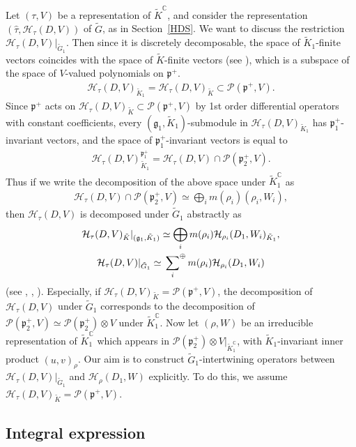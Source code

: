 \documentclass[pdftex]{sigma}
\numberwithin{equation}{section}
\newcommand{\BC}{\mathbb{C}}
\newcommand{\fg}{\mathfrak{g}}
\newcommand{\fp}{\mathfrak{p}}
\newcommand{\cH}{\mathcal{H}}
\newcommand{\cP}{\mathcal{P}}
\newcommand{\hsum}{\sideset{}{^\oplus}{\sum}}
\begin{document}
Let $(\tau,V)$ be a representation of $\tilde{K}^\BC$, and consider the representation $(\hat{\tau},\cH_\tau(D,V))$ of $\tilde{G}$, as in Section~\ref{HDS}.
We want to discuss the restriction $\cH_\tau(D,V)|_{\tilde{G}_1}$.
Then since it is discretely decomposable, the space of $\tilde{K}_1$-finite vectors coincides with the space of $\tilde{K}$-finite vectors
(see \cite[Theorem~4.5]{K1}),
which is a subspace of the space of $V$-valued polynomials on $\fp^+$.
\begin{gather*} \cH_\tau(D,V)_{\tilde{K}_1}=\cH_\tau(D,V)_{\tilde{K}}\subset\cP(\fp^+,V). \end{gather*}
Since $\fp^+$ acts on $\cH_\tau(D,V)_{\tilde{K}}\subset\cP(\fp^+,V)$ by 1st order differential operators with constant coefficients,
every $(\fg_1,\tilde{K}_1)$-submodule in $\cH_\tau(D,V)_{\tilde{K}_1}$ has $\fp^+_1$-invariant vectors,
and the space of $\fp^+_1$-invariant vectors is equal to
\begin{gather*} \cH_\tau(D,V)_{\tilde{K}_1}^{\fp^+_1}=\cH_\tau(D,V)\cap\cP(\fp^+_2,V). \end{gather*}
Thus if we write the decomposition of the above space under $\tilde{K}_1^\BC$ as
\begin{gather*} \cH_\tau(D,V)\cap\cP(\fp^+_2,V)\simeq \bigoplus_i m(\rho_i)(\rho_i,W_i), \end{gather*}
then $\cH_\tau(D,V)$ is decomposed under $\tilde{G}_1$ abstractly as
\begin{gather*}
\cH_\tau(D,V)_{\tilde{K}}|_{(\fg_1,\tilde{K}_1)} \simeq \bigoplus_i m(\rho_i)\cH_{\rho_i}(D_1,W_i)_{\tilde{K}_1},\\
\cH_\tau(D,V)|_{\tilde{G}_1} \simeq \hsum_i m(\rho_i)\cH_{\rho_i}(D_1,W_i)
\end{gather*}
(see \cite{JV}, \cite[Section 8]{Kmf1}, \cite{Ma}). Especially, if $\cH_\tau(D,V)_{\tilde{K}}=\cP(\fp^+, V)$, the decomposition of
$\cH_\tau(D,V)$ under $\tilde{G}_1$ corresponds to the decomposition of $\cP(\fp^+_2,V)\simeq\cP(\fp^+_2)\otimes V$ under $\tilde{K}_1^\BC$.
Now let $(\rho,W)$ be an irreducible representation of $\tilde{K}_1^\BC$ which appears in $\cP(\fp^+_2)\otimes V|_{\tilde{K}_1^\BC}$,
with $\tilde{K}_1$-invariant inner product $(u,v)_\rho$.
Our aim is to construct $\tilde{G}_1$-intertwining operators between $\cH_\tau(D,V)|_{\tilde{G}_1}$ and $\cH_\rho(D_1,W)$
explicitly. To do this, we assume $\cH_\tau(D,V)_{\tilde{K}}=\cP(\fp^+,V)$.

\subsection{Integral expression}
\end{document}
